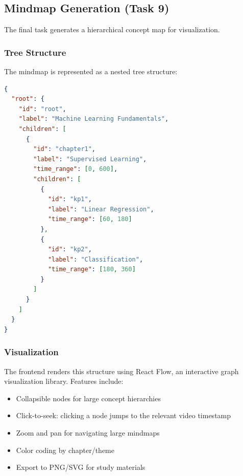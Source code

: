 \subsection{Mindmap Generation (Task 9)}

The final task generates a hierarchical concept map for visualization.

\subsubsection{Tree Structure}

The mindmap is represented as a nested tree structure:

\begin{lstlisting}[language=json, caption={Mindmap JSON Structure}]
{
  "root": {
    "id": "root",
    "label": "Machine Learning Fundamentals",
    "children": [
      {
        "id": "chapter1",
        "label": "Supervised Learning",
        "time_range": [0, 600],
        "children": [
          {
            "id": "kp1",
            "label": "Linear Regression",
            "time_range": [60, 180]
          },
          {
            "id": "kp2",
            "label": "Classification",
            "time_range": [180, 360]
          }
        ]
      }
    ]
  }
}
\end{lstlisting}

\subsubsection{Visualization}

The frontend renders this structure using React Flow, an interactive graph visualization library. Features include:

\begin{itemize}
    \item Collapsible nodes for large concept hierarchies
    \item Click-to-seek: clicking a node jumps to the relevant video timestamp
    \item Zoom and pan for navigating large mindmaps
    \item Color coding by chapter/theme
    \item Export to PNG/SVG for study materials
\end{itemize}
